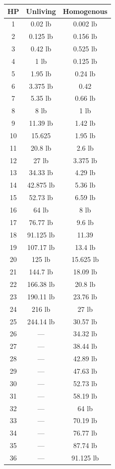 \begin{multicols}{3}
	\begin{center}
		\begin{tabular}{|c|c|c|}
			\hline
			HP & Unliving & Homogenous\\
			\hline
			\hline
			1 & 0.02 lb & 0.002 lb\\
			2 & 0.125 lb & 0.156 lb \\
			3 & 0.42 lb & 0.525 lb \\
			4 & 1 lb & 0.125 lb \\
			5 & 1.95 lb & 0.24 lb \\
			6 & 3.375 lb & 0.42 \\
			7 & 5.35 lb & 0.66 lb \\
			8 & 8 lb & 1 lb \\
			9 & 11.39 lb & 1.42 lb \\
			10 & 15.625 & 1.95 lb \\
			11 & 20.8 lb & 2.6 lb \\
			12 & 27 lb & 3.375 lb \\
			13 & 34.33 lb & 4.29 lb \\
			14 & 42.875 lb & 5.36 lb \\
			15 & 52.73 lb & 6.59 lb \\
			16 & 64 lb & 8 lb \\
			17 & 76.77 lb & 9.6 lb \\
			18 & 91.125 lb & 11.39 \\
			19 & 107.17 lb & 13.4 lb \\
			20 & 125 lb & 15.625 lb \\
			21 & 144.7 lb & 18.09 lb \\
			22 & 166.38 lb & 20.8 lb\\
			23 & 190.11 lb & 23.76 lb \\
			24 & 216 lb & 27 lb \\
			25 & 244.14 lb & 30.57 lb \\
			26 & — & 34.32 lb \\
			27 & — & 38.44 lb \\
			28 & — & 42.89 lb \\
			29 & — & 47.63 lb \\
			30 & — & 52.73 lb \\
			31 & — & 58.19 lb \\
			32 & — & 64 lb \\
			33 & — & 70.19 lb \\
			34 & — & 76.77 lb \\
			35 & — & 87.74 lb \\
			36 & — & 91.125 lb \\

\end{tabular}
\end{center}
\end{multicols}

